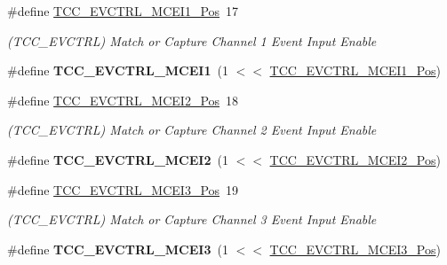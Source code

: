 \begin{DoxyCompactItemize}
\item 
\hypertarget{group___s_a_m_l21___t_c_c_ga99531339cefe0e44514da5695584f249}{}\#define \hyperlink{group___s_a_m_l21___t_c_c_ga99531339cefe0e44514da5695584f249}{T\+C\+C\+\_\+\+E\+V\+C\+T\+R\+L\+\_\+\+M\+C\+E\+I1\+\_\+\+Pos}~17\label{group___s_a_m_l21___t_c_c_ga99531339cefe0e44514da5695584f249}

\begin{DoxyCompactList}\small\item\em (T\+C\+C\+\_\+\+E\+V\+C\+T\+R\+L) Match or Capture Channel 1 Event Input Enable \end{DoxyCompactList}\item 
\hypertarget{group___s_a_m_l21___t_c_c_ga96732d92355c0007a318bb8c94f122ea}{}\#define {\bfseries T\+C\+C\+\_\+\+E\+V\+C\+T\+R\+L\+\_\+\+M\+C\+E\+I1}~(1 $<$$<$ \hyperlink{group___s_a_m_l21___t_c_c_ga99531339cefe0e44514da5695584f249}{T\+C\+C\+\_\+\+E\+V\+C\+T\+R\+L\+\_\+\+M\+C\+E\+I1\+\_\+\+Pos})\label{group___s_a_m_l21___t_c_c_ga96732d92355c0007a318bb8c94f122ea}

\item 
\hypertarget{group___s_a_m_l21___t_c_c_gac42d27e9c0a0307f5d19d37b0eb9ab2f}{}\#define \hyperlink{group___s_a_m_l21___t_c_c_gac42d27e9c0a0307f5d19d37b0eb9ab2f}{T\+C\+C\+\_\+\+E\+V\+C\+T\+R\+L\+\_\+\+M\+C\+E\+I2\+\_\+\+Pos}~18\label{group___s_a_m_l21___t_c_c_gac42d27e9c0a0307f5d19d37b0eb9ab2f}

\begin{DoxyCompactList}\small\item\em (T\+C\+C\+\_\+\+E\+V\+C\+T\+R\+L) Match or Capture Channel 2 Event Input Enable \end{DoxyCompactList}\item 
\hypertarget{group___s_a_m_l21___t_c_c_ga0d56e473005ae4b4837e06989b70121e}{}\#define {\bfseries T\+C\+C\+\_\+\+E\+V\+C\+T\+R\+L\+\_\+\+M\+C\+E\+I2}~(1 $<$$<$ \hyperlink{group___s_a_m_l21___t_c_c_gac42d27e9c0a0307f5d19d37b0eb9ab2f}{T\+C\+C\+\_\+\+E\+V\+C\+T\+R\+L\+\_\+\+M\+C\+E\+I2\+\_\+\+Pos})\label{group___s_a_m_l21___t_c_c_ga0d56e473005ae4b4837e06989b70121e}

\item 
\hypertarget{group___s_a_m_l21___t_c_c_ga46f2694c6d9395064ec8a6d01bfeb945}{}\#define \hyperlink{group___s_a_m_l21___t_c_c_ga46f2694c6d9395064ec8a6d01bfeb945}{T\+C\+C\+\_\+\+E\+V\+C\+T\+R\+L\+\_\+\+M\+C\+E\+I3\+\_\+\+Pos}~19\label{group___s_a_m_l21___t_c_c_ga46f2694c6d9395064ec8a6d01bfeb945}

\begin{DoxyCompactList}\small\item\em (T\+C\+C\+\_\+\+E\+V\+C\+T\+R\+L) Match or Capture Channel 3 Event Input Enable \end{DoxyCompactList}\item 
\hypertarget{group___s_a_m_l21___t_c_c_ga245a7504155c8069a911031e95324d06}{}\#define {\bfseries T\+C\+C\+\_\+\+E\+V\+C\+T\+R\+L\+\_\+\+M\+C\+E\+I3}~(1 $<$$<$ \hyperlink{group___s_a_m_l21___t_c_c_ga46f2694c6d9395064ec8a6d01bfeb945}{T\+C\+C\+\_\+\+E\+V\+C\+T\+R\+L\+\_\+\+M\+C\+E\+I3\+\_\+\+Pos})\label{group___s_a_m_l21___t_c_c_ga245a7504155c8069a911031e95324d06}


\end{DoxyCompactItemize}
